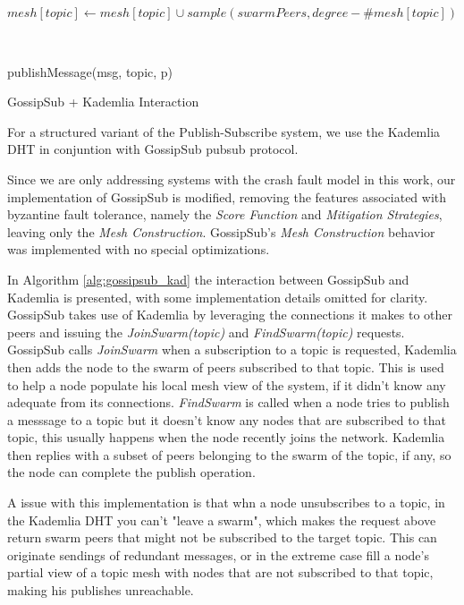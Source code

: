 \documentclass[sigconf]{acmart}
\begin{document}
\begin{algorithm}[htp]
     {
         {
            $mesh[topic] \leftarrow mesh[topic] \cup sample(swarmPeers, degree - \#mesh[topic])$\;
        }
    }

    \texttt{\\}

     {
         {
             {
                \Call publishMessage(msg, topic, p)\;
            }
        }
    }

    \caption{GossipSub + Kademlia Interaction}
    \label{alg:gossipsub_kad}
\end{algorithm}

For a structured variant of the Publish-Subscribe system, we use the Kademlia DHT in conjuntion with GossipSub pubsub protocol.

Since we are only addressing systems with the crash fault model in this work, our implementation of GossipSub is modified, removing the features associated with byzantine fault tolerance, namely the \textit{Score Function} and \textit{Mitigation Strategies}, leaving only the \textit{Mesh Construction}. GossipSub's \textit{Mesh Construction} behavior was implemented with no special optimizations. 

In Algorithm \ref{alg:gossipsub_kad} the interaction between GossipSub and Kademlia is presented, with some implementation details omitted for clarity. GossipSub takes use of Kademlia by leveraging the connections it makes to other peers and issuing the \textit{JoinSwarm(topic)} and \textit{FindSwarm(topic)} requests. 
GossipSub calls \textit{JoinSwarm} when a subscription to a topic is requested, Kademlia then adds the node to the swarm of peers subscribed to that topic. This is used to help a node populate his local mesh view of the system, if it didn't know any adequate from its connections.  
\textit{FindSwarm} is called when a node tries to publish a messsage to a topic but it doesn't know any nodes that are subscribed to that topic, this usually happens when the node recently joins the network. Kademlia then replies with a subset of peers belonging to the swarm of the topic, if any, so the node can complete the publish operation.

A issue with this implementation is that whn a node unsubscribes to a topic, in the Kademlia DHT you can't "leave a swarm", which makes the request above return swarm peers that might not be subscribed to the target topic. This can originate sendings of redundant messages, or in the extreme case fill a node's partial view of a topic mesh with nodes that are not subscribed to that topic, making his publishes unreachable.
\end{document}
